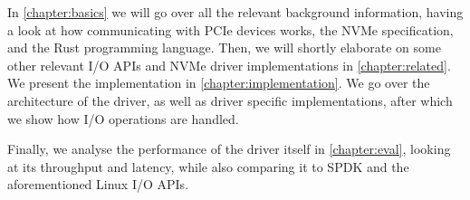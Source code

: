 In \autoref{chapter:basics} we will go over all the relevant background information, having a look at how communicating with PCIe devices works, the NVMe specification, and the Rust programming language. Then, we will shortly elaborate on some other relevant I/O APIs and NVMe driver implementations in \autoref{chapter:related}.
We present the implementation in \autoref{chapter:implementation}. We go over the architecture of the driver, as well as driver specific implementations, after which we show how I/O operations are handled.

Finally, we analyse the performance of the driver itself in \autoref{chapter:eval}, looking at its throughput and latency, while also comparing it to SPDK and the aforementioned Linux I/O APIs.
